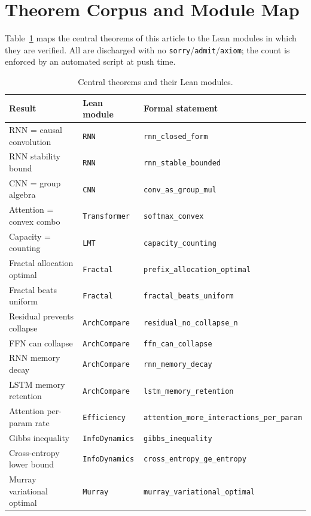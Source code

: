 \documentclass[journal]{IEEEtran}
\begin{document}
\appendices
\section{Theorem Corpus and Module Map}
\label{app:map}
Table~\ref{table_corpus} maps the central theorems of this article to the Lean
modules in which they are verified. All are discharged with no
\texttt{sorry}/\texttt{admit}/\texttt{axiom}; the count is enforced by an
automated script at push time.

\begin{table}[!t]
\renewcommand{\arraystretch}{1.3}
\caption{Central theorems and their Lean modules.}
\label{table_corpus}
\centering
\begin{tabular}{@{}lll@{}}
\toprule
Result & Lean module & Formal statement \\
\midrule
RNN = causal convolution & \texttt{RNN} & \texttt{rnn\_closed\_form} \\
RNN stability bound & \texttt{RNN} & \texttt{rnn\_stable\_bounded} \\
CNN = group algebra & \texttt{CNN} & \texttt{conv\_as\_group\_mul} \\
Attention = convex combo & \texttt{Transformer} & \texttt{softmax\_convex} \\
Capacity = counting & \texttt{LMT} & \texttt{capacity\_counting} \\
Fractal allocation optimal & \texttt{Fractal} & \texttt{prefix\_allocation\_optimal} \\
Fractal beats uniform & \texttt{Fractal} & \texttt{fractal\_beats\_uniform} \\
Residual prevents collapse & \texttt{ArchCompare} & \texttt{residual\_no\_collapse\_n} \\
FFN can collapse & \texttt{ArchCompare} & \texttt{ffn\_can\_collapse} \\
RNN memory decay & \texttt{ArchCompare} & \texttt{rnn\_memory\_decay} \\
LSTM memory retention & \texttt{ArchCompare} & \texttt{lstm\_memory\_retention} \\
Attention per-param rate & \texttt{Efficiency} & \texttt{attention\_more\_interactions\_per\_param} \\
Gibbs inequality & \texttt{InfoDynamics} & \texttt{gibbs\_inequality} \\
Cross-entropy lower bound & \texttt{InfoDynamics} & \texttt{cross\_entropy\_ge\_entropy} \\
Murray variational optimal & \texttt{Murray} & \texttt{murray\_variational\_optimal} \\

\end{tabular}
\end{table}
\end{document}
